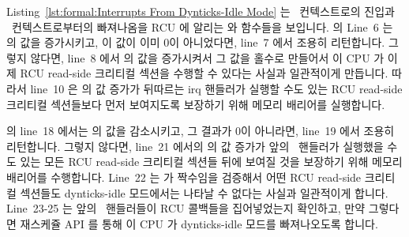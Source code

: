 Listing~\ref{lst:formal:Interrupts From Dynticks-Idle Mode}
는 \IRQ\ 컨텍스트로의 진입과 \IRQ\ 컨텍스트로부터의 빠져나옴을 RCU 에 알리는
 와  함수들을 보입니다.
 의 Line~6 는  의 값을 증가시키고, 이
값이 이미 0이 아니었다면, line~7 에서 조용히 리턴합니다.
그렇지 않다면, line~8 에서  의 값을 증가시켜서 그 값을 홀수로
만들어서 이 CPU 가 이제 RCU read-side 크리티컬 섹션을 수행할 수 있다는 사실과
일관적이게 만듭니다.
따라서 line~10 은  의 값 증가가 뒤따르는 irq 핸들러가 실행할 수도
있는 RCU read-side 크리티컬 섹션들보다 먼저 보여지도록 보장하기 위해 메모리
배리어를 실행합니다.
\iffalse

Listing~\ref{lst:formal:Interrupts From Dynticks-Idle Mode}
shows \co{rcu_irq_enter()} and \co{rcu_irq_exit()}, which
inform RCU of entry to and exit from, respectively, \IRQ\ context.
Line~6 of \co{rcu_irq_enter()} increments \co{dynticks_nesting},
and if this variable was already non-zero, line~7 silently returns.
Otherwise, line~8 increments \co{dynticks}, which will then have
an odd value, consistent with the fact that this CPU can now
execute RCU read-side critical sections.
Line~10 therefore executes a memory barrier to ensure that
the increment of \co{dynticks} is seen before any
RCU read-side critical sections that the subsequent \IRQ\ handler
might execute.
\fi

 의 line~18 에서는  의 값을 감소시키고,
그 결과가 0이 아니라면, line~19 에서 조용히 리턴합니다.
그렇지 않다면, line~21 에서의  의 값 증가가 앞의 \IRQ\ 핸들러가
실행했을 수도 있는 모든 RCU read-side 크리티컬 섹션들 뒤에 보여질 것을 보장하기
위해 메모리 배리어를 수행합니다.
Line~22 는  가 짝수임을 검증해서 어떤 RCU read-side 크리티컬
섹션들도 dynticks-idle 모드에서는 나타날 수 없다는 사실과 일관적이게 합니다.
Line~23-25 는 앞의 \IRQ\ 핸들러들이 RCU 콜백들을 집어넣었는지 확인하고, 만약
그렇다면 재스케쥴 API 를 통해 이 CPU 가 dynticks-idle 모드를 빠져나오도록
합니다.
\iffalse

Line~18 of \co{rcu_irq_exit()} decrements \co{dynticks_nesting}, and
if the result is non-zero, line~19 silently returns.
Otherwise, line~20 executes a memory barrier to ensure that the
increment of \co{dynticks} on line~21 is seen after any RCU
read-side critical sections that the prior \IRQ\ handler might have executed.
Line~22 verifies that \co{dynticks} is now even, consistent with
the fact that no RCU read-side critical sections may appear in
dynticks-idle mode.
Lines~23-25 check to see if the prior \IRQ\ handlers enqueued any
RCU callbacks, forcing this CPU out of dynticks-idle mode via
a reschedule API if so.
\fi

